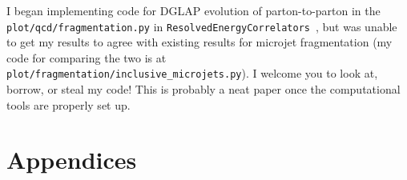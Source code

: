 I began implementing code for DGLAP evolution of \gls{parton-to-parton} in the \texttt{plot/qcd/fragmentation.py} in \texttt{ResolvedEnergyCorrelators}~\cite{github:RENC}, but was unable to get my results to agree with existing results for microjet fragmentation \cite{Dasgupta:2014yra,Dasgupta:2016bnd} (my code for comparing the two is at \texttt{plot/fragmentation/inclusive\_microjets.py}).
%
I welcome you to look at, borrow, or steal my code!
%
This is probably a neat paper once the computational tools are properly set up.





\iffalse
\section*{Appendices}


